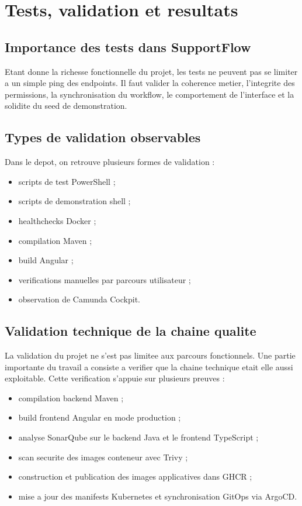 ﻿\chapter{Tests, validation et resultats}

\section{Importance des tests dans SupportFlow}

Etant donne la richesse fonctionnelle du projet, les tests ne peuvent pas se limiter a un simple ping des endpoints. Il faut valider la coherence metier, l'integrite des permissions, la synchronisation du workflow, le comportement de l'interface et la solidite du seed de demonstration.

\section{Types de validation observables}

Dans le depot, on retrouve plusieurs formes de validation :

\begin{itemize}[leftmargin=1.2cm]
  \item scripts de test PowerShell ;
  \item scripts de demonstration shell ;
  \item healthchecks Docker ;
  \item compilation Maven ;
  \item build Angular ;
  \item verifications manuelles par parcours utilisateur ;
  \item observation de Camunda Cockpit.
\end{itemize}

\section{Validation technique de la chaine qualite}

La validation du projet ne s'est pas limitee aux parcours fonctionnels. Une partie importante du travail a consiste a verifier que la chaine technique etait elle aussi exploitable. Cette verification s'appuie sur plusieurs preuves :

\begin{itemize}[leftmargin=1.2cm]
  \item compilation backend Maven ;
  \item build frontend Angular en mode production ;
  \item analyse SonarQube sur le backend Java et le frontend TypeScript ;
  \item scan securite des images conteneur avec Trivy ;
  \item construction et publication des images applicatives dans GHCR ;
  \item mise a jour des manifests Kubernetes et synchronisation GitOps via ArgoCD.
\end{itemize}

